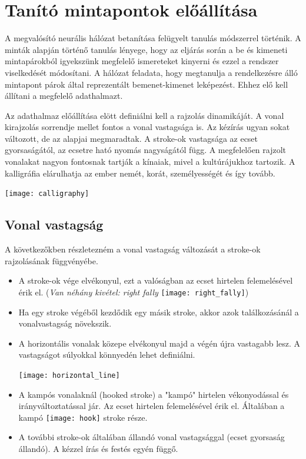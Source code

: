 
\section{Tanító mintapontok előállítása}

A megvalósító neurális hálózat betanítása felügyelt tanulás módszerrel történik. A minták alapján történő tanulás lényege, hogy az eljárás során a be és kimeneti mintapárokból igyekszünk megfelelő ismereteket kinyerni és ezzel a rendszer viselkedését módosítani. A hálózat feladata, hogy megtanulja a rendelkezésre álló mintapont párok által reprezentált bemenet-kimenet leképezést. Ehhez elő kell állítani a megfelelő adathalmazt.

Az adathalmaz előállítása elött definiálni kell a rajzolás dinamikáját. A vonal kirajzolás sorrendje mellet fontos a vonal vastagsága is. Az kézírás ugyan sokat változott, de az alapjai megmaradtak. A stroke-ok vastagsága az ecset gyorsaságától, az ecsetre ható nyomás nagyságától függ. A megfelelően rajzolt vonalakat nagyon fontosnak tartják a kínaiak, mivel a kultúrájukhoz tartozik. A kalligráfia elárulhatja az ember nemét, korát, személyességét és így tovább.

\begin{center}
\texttt{[image: calligraphy]}
\end{center}

\subsection{Vonal vastagság}

A következőkben részletezném a vonal vastagság változását a stroke-ok rajzolásának függvényébe. 

\begin{itemize}
\item A stroke-ok vége elvékonyul, ezt a valóságban az ecset hirtelen felemelésével érik el. (\textit{Van néhány kivétel: right fally} \texttt{[image: right\_fally]}) 
\item Ha egy stroke végéből kezdődik egy másik stroke, akkor azok találkozásánál a vonalvastagság növekszik.
\item A horizontális vonalak közepe elvékonyul majd a végén újra vastagabb lesz. A vastagságot súlyokkal könnyedén lehet definiálni.

\begin{center}
\texttt{[image: horizontal\_line]}
\end{center}

\item A kampós vonalaknál (hooked stroke) a "kampó" hirtelen vékonyodással és irányváltoztatással jár. Az ecset hirtelen felemelésével érik el. Általában a kampó \texttt{[image: hook]} stroke része.
\item A további stroke-ok általában állandó vonal vastagsággal (ecset gyorsaság állandó). A kézzel írás és festés egyén függő.
\end{itemize}

